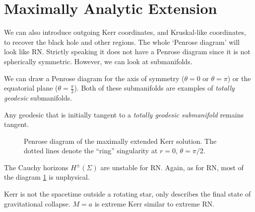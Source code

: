 \section{Maximally Analytic Extension}%
\label{sec:maximally_analytic_extension}

We can also introduce outgoing Kerr coordinates, and Kruskal-like coordinates, to recover the black hole and other regions.
The whole `Penrose diagram' will look like RN.
Strictly speaking it does not have a Penrose diagram since it is not spherically symmetric.
However, we can look at submanifolds.

We can draw a Penrose diagram for the axis of symmetry ($\theta = 0$ or $\theta = \pi$) or the equatorial plane ($\theta = \frac{\pi}{2}$).
Both of these submanifolds are examples of \emph{totally geodesic} submanifolds.
\begin{definition}
  Any geodesic that is initially tangent to a \emph{totally geodesic submanifold} remains tangent.
\end{definition}
\begin{figure}[ptbh]
  \centering
  \def\svgwidth{0.5\columnwidth}
  
  \caption{Penrose diagram of the maximally extended Kerr solution. The dotted lines denote the ``ring'' singularity at $r = 0$, $\theta = \pi / 2$. }
  \label{fig:l15f1}
\end{figure}

The Cauchy horizons $H^{\pm}(\Sigma)$ are unstable for RN. Again, as for RN, most of the diagram \ref{fig:l15f1} is unphysical.

Kerr is not the spacetime outside a rotating star, only describes the final state of gravitational collapse. 
$M = a$ is extreme Kerr similar to extreme RN.
